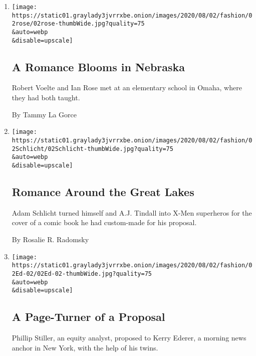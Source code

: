 \begin{enumerate}
\def\labelenumi{\arabic{enumi}.}
\item
  \href{/2020/07/31/fashion/weddings/a-romance-blooms-in-nebraska.html}{}

  \texttt{[image: https://static01.graylady3jvrrxbe.onion/images/2020/08/02/fashion/02rose/02rose-thumbWide.jpg?quality=75\\\&auto=webp\\\&disable=upscale]}

  \hypertarget{a-romance-blooms-in-nebraska}{%
  \subsection{A Romance Blooms in
  Nebraska}\label{a-romance-blooms-in-nebraska}}

  Robert Voelte and Ian Rose met at an elementary school in Omaha, where
  they had both taught.

  By Tammy La Gorce
\item
  \href{/2020/07/31/fashion/weddings/romance-around-the-great-lakes.html}{}

  \texttt{[image: https://static01.graylady3jvrrxbe.onion/images/2020/08/02/fashion/02Schlicht/02Schlicht-thumbWide.jpg?quality=75\\\&auto=webp\\\&disable=upscale]}

  \hypertarget{romance-around-the-great-lakes}{%
  \subsection{Romance Around the Great
  Lakes}\label{romance-around-the-great-lakes}}

  Adam Schlicht turned himself and A.J. Tindall into X-Men superheros
  for the cover of a comic book he had custom-made for his proposal.

  By Rosalie R. Radomsky
\item
  \href{/2020/07/31/fashion/weddings/a-page-turner-of-a-proposal.html}{}

  \texttt{[image: https://static01.graylady3jvrrxbe.onion/images/2020/08/02/fashion/02Ed-02/02Ed-02-thumbWide.jpg?quality=75\\\&auto=webp\\\&disable=upscale]}

  \hypertarget{a-page-turner-of-a-proposal}{%
  \subsection{A Page-Turner of a
  Proposal}\label{a-page-turner-of-a-proposal}}

  Phillip Stiller, an equity analyst, proposed to Kerry Ederer, a
  morning news anchor in New York, with the help of his twins.


\end{enumerate}
